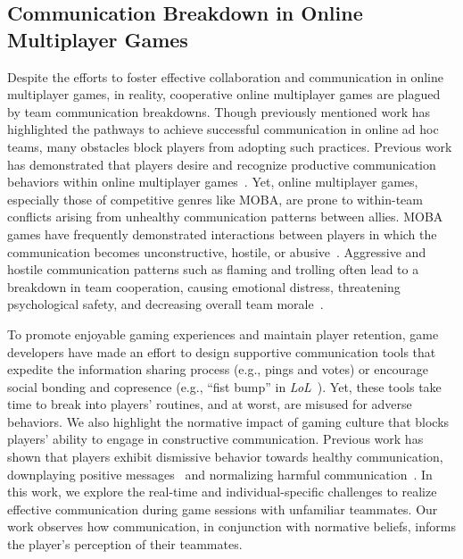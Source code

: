 \subsection{Communication Breakdown in Online Multiplayer Games}

Despite the efforts to foster effective collaboration and communication in online multiplayer games, in reality, cooperative online multiplayer games are plagued by team communication breakdowns. Though previously mentioned work has highlighted the pathways to achieve successful communication in online ad hoc teams, many obstacles block players from adopting such practices. Previous work has demonstrated that players desire and recognize productive communication behaviors within online multiplayer games~\cite{kou2014}. Yet, online multiplayer games, especially those of competitive genres like MOBA, are prone to within-team conflicts arising from unhealthy communication patterns between allies. MOBA games have frequently demonstrated interactions between players in which the communication becomes unconstructive, hostile, or abusive~\cite{kou2020toxic, beres2021, nexo2023players}. Aggressive and hostile communication patterns such as flaming and trolling often lead to a breakdown in team cooperation, causing emotional distress, threatening psychological safety, and decreasing overall team morale~\cite{kou2020toxic}.

To promote enjoyable gaming experiences and maintain player retention, game developers have made an effort to design supportive communication tools that expedite the information sharing process (e.g., pings and votes) or encourage social bonding and copresence (e.g., ``fist bump'' in \textit{LoL}~\cite{jarvis2024}). Yet, these tools take time to break into players' routines, and at worst, are misused for adverse behaviors. We also highlight the normative impact of gaming culture that blocks players' ability to engage in constructive communication. Previous work has shown that players exhibit dismissive behavior towards healthy communication, downplaying positive messages~\cite{poeller2023} and normalizing harmful communication~\cite{beres2021}. In this work, we explore the real-time and individual-specific challenges to realize effective communication during game sessions with unfamiliar teammates. Our work observes how communication, in conjunction with normative beliefs, informs the player's perception of their teammates.